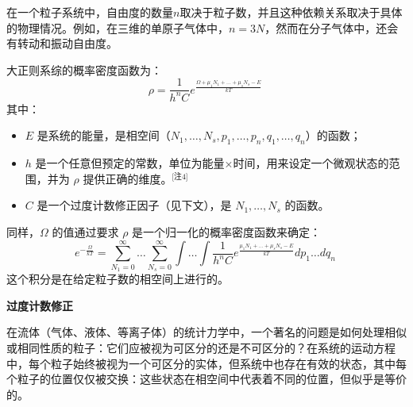 在一个粒子系统中，自由度的数量\( n \)取决于粒子数，并且这种依赖关系取决于具体的物理情况。例如，在三维的单原子气体中，\( n = 3N \)，然而在分子气体中，还会有转动和振动自由度。

大正则系综的概率密度函数为：
\[
\rho = \frac{1}{h^n C} e^{\frac{\Omega + \mu_1 N_1 + \dots + \mu_s N_s - E}{kT}}~
\]
其中：
\begin{itemize}
\item \( E \) 是系统的能量，是相空间（\( N_1, \dots, N_s, p_1, \dots, p_n, q_1, \dots, q_n \)）的函数；
\item \( h \) 是一个任意但预定的常数，单位为能量×时间，用来设定一个微观状态的范围，并为 \( \rho \) 提供正确的维度。\(^\text{[注4]}\)
\item \( C \) 是一个过度计数修正因子（见下文），是 \( N_1, \dots, N_s \) 的函数。
\end{itemize}
同样，\( \Omega \) 的值通过要求 \( \rho \) 是一个归一化的概率密度函数来确定：
\[
e^{-\frac{\Omega}{kT}} = \sum_{N_1=0}^{\infty} \dots \sum_{N_s=0}^{\infty} \int \dots \int \frac{1}{h^n C} e^{\frac{\mu_1 N_1 + \dots + \mu_s N_s - E}{kT}} dp_1 \dots dq_n~
\]
这个积分是在给定粒子数的相空间上进行的。

\textbf{过度计数修正} 
 
在流体（气体、液体、等离子体）的统计力学中，一个著名的问题是如何处理相似或相同性质的粒子：它们应被视为可区分的还是不可区分的？在系统的运动方程中，每个粒子始终被视为一个可区分的实体，但系统中也存在有效的状态，其中每个粒子的位置仅仅被交换：这些状态在相空间中代表着不同的位置，但似乎是等价的。

